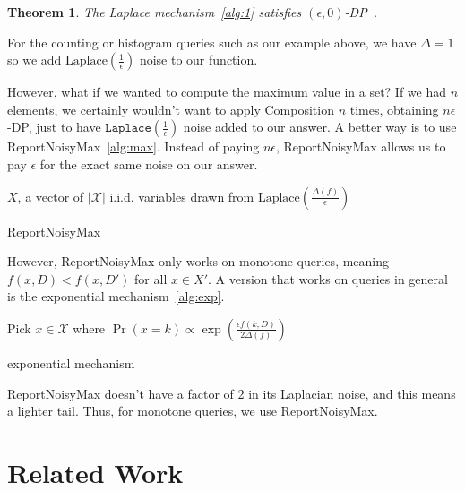 \documentclass[11pt]{report}
\newtheorem{theorem}{Theorem}
\renewcommand{\t}[1]{\texttt{#1}}
\begin{document}
\begin{theorem}
The Laplace mechanism~\ref{alg:1} satisfies $(\epsilon, 0)$-DP~\cite{Dwork:2006}.
\end{theorem}
For the counting or histogram queries such as our example above, we have $\Delta = 1$ so we add $\text{Laplace}\left(\frac{1}{\epsilon}\right)$ noise to our function.

However, what if we wanted to compute the maximum value in a set? If we had $n$ elements, we certainly wouldn't want to apply Composition $n$ times, obtaining $n\epsilon$-DP, just to have $\t{Laplace}\left(\frac{1}{\epsilon}\right)$ noise added to our answer. A better way is to use ReportNoisyMax~\ref{alg:max}. Instead of paying $n\epsilon$, ReportNoisyMax allows us to pay $\epsilon$ for the exact same noise on our answer.
\begin{algorithm}\label{alg:max}
\SetAlgoLined
{}
$X$, a vector of $|\mathcal{X}|$ i.i.d. variables drawn from $\text{Laplace}\left(\frac{\Delta(f)}{\epsilon}\right)$\;
\caption{ReportNoisyMax}
\end{algorithm}
However, ReportNoisyMax only works on monotone queries, meaning $f(x, D) < f(x, D')$ for all $x \in X'$. A version that works on queries in general is the exponential mechanism~\ref{alg:exp}.
\begin{algorithm}\label{alg:exp}
\SetAlgoLined
{}
Pick $x \in \mathcal{X}$ where $\Pr(x=k) \propto \exp\left(\frac{\epsilon f(k, D)}{2\Delta(f)}\right)$\;
\caption{exponential mechanism}
\end{algorithm}
ReportNoisyMax doesn't have a factor of 2 in its Laplacian noise, and this means a lighter tail. Thus, for monotone queries, we use ReportNoisyMax.
\section{Related Work}
\end{document}
